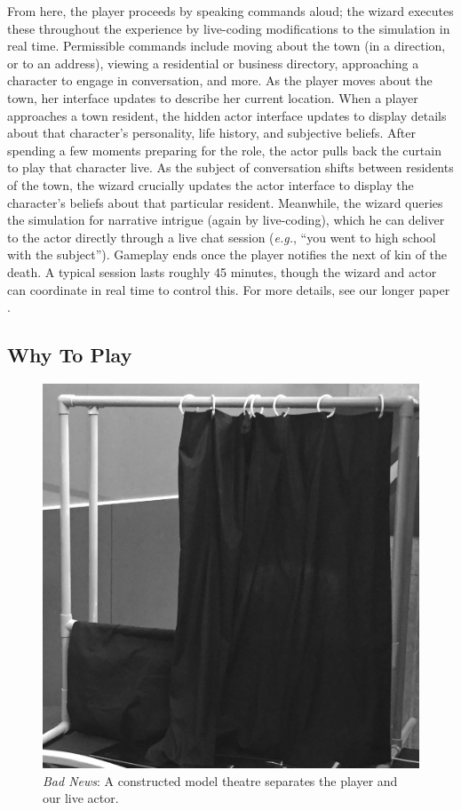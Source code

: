 \documentclass[letterpaper]{article}
\begin{document}
From here, the player proceeds by speaking commands aloud; the wizard executes these throughout the experience by live-coding modifications to the simulation in real time.
Permissible commands include moving about the town (in a direction, or to an address), viewing a residential or business directory, approaching a character to engage in conversation, and more.
As the player moves about the town, her interface updates to describe her current location.
When a player approaches a town resident, the hidden actor interface updates to display details about that character's personality, life history, and subjective beliefs.
After spending a few moments preparing for the role, the actor pulls back the curtain to play that character live.
As the subject of conversation shifts between residents of the town, the wizard crucially updates the actor interface to display the character's beliefs about that particular resident.
Meanwhile, the wizard queries the simulation for narrative intrigue (again by live-coding), which he can deliver to the actor directly through a live chat session (\textit{e.g.}, ``you went to high school with the subject'').
Gameplay ends once the player notifies the next of kin of the death.
A typical session lasts roughly 45 minutes, though the wizard and actor can coordinate in real time to control this.
For more details, see our longer paper \cite{samuel2016bad}.


\subsection{Why To Play}


\begin{figure}[t]
  \centering
  \includegraphics[width=0.64\columnwidth]{images/bad_news-the_puppet_theatre}
  \caption{\textit{Bad News}: A constructed model theatre separates the player and our live actor.}
  \label{fig:bn-model_theatre}
\end{figure}
\end{document}
